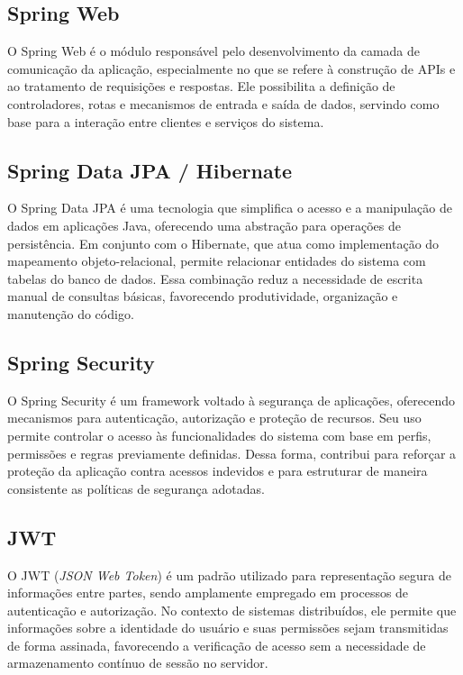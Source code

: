 \documentclass[grad,pdftex]{poli}
\begin{document}
\subsection{Spring Web}

O Spring Web é o módulo responsável pelo desenvolvimento da camada de comunicação da aplicação, especialmente no que se refere à construção de APIs e ao tratamento de requisições e respostas. Ele possibilita a definição de controladores, rotas e mecanismos de entrada e saída de dados, servindo como base para a interação entre clientes e serviços do sistema.

\subsection{Spring Data JPA / Hibernate}

O Spring Data JPA é uma tecnologia que simplifica o acesso e a manipulação de dados em aplicações Java, oferecendo uma abstração para operações de persistência. Em conjunto com o Hibernate, que atua como implementação do mapeamento objeto-relacional, permite relacionar entidades do sistema com tabelas do banco de dados. Essa combinação reduz a necessidade de escrita manual de consultas básicas, favorecendo produtividade, organização e manutenção do código.

\subsection{Spring Security}

O Spring Security é um framework voltado à segurança de aplicações, oferecendo mecanismos para autenticação, autorização e proteção de recursos. Seu uso permite controlar o acesso às funcionalidades do sistema com base em perfis, permissões e regras previamente definidas. Dessa forma, contribui para reforçar a proteção da aplicação contra acessos indevidos e para estruturar de maneira consistente as políticas de segurança adotadas.

\subsection{JWT}

O JWT (\textit{JSON Web Token}) é um padrão utilizado para representação segura de informações entre partes, sendo amplamente empregado em processos de autenticação e autorização. No contexto de sistemas distribuídos, ele permite que informações sobre a identidade do usuário e suas permissões sejam transmitidas de forma assinada, favorecendo a verificação de acesso sem a necessidade de armazenamento contínuo de sessão no servidor.
\end{document}
